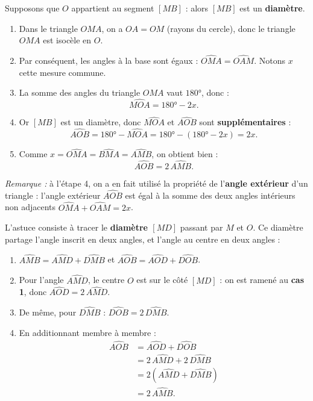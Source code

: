 \documentclass[11pt]{article}
\newcommand{\cle}[1]{{\popxbold\color{popdark}#1}}
\begin{document}
\begin{experience}
Supposons que $O$ appartient au segment $[MB]$ : alors $[MB]$ est un \textbf{diamètre}.
\begin{enumerate}
\item Dans le triangle $OMA$, on a $OA = OM$ (rayons du cercle), donc le triangle $OMA$ est \cle{isocèle} en $O$.
\item Par conséquent, les angles à la base sont égaux : $\widehat{OMA} = \widehat{OAM}$. Notons $x$ cette mesure commune.
\item La somme des angles du triangle $OMA$ vaut $180°$, donc :
\[ \widehat{MOA} = 180° - 2x. \]
\item Or $[MB]$ est un diamètre, donc $\widehat{MOA}$ et $\widehat{AOB}$ sont \textbf{supplémentaires} :
\[ \widehat{AOB} = 180° - \widehat{MOA} = 180° - (180° - 2x) = 2x. \]
\item Comme $x = \widehat{OMA} = \widehat{BMA} = \widehat{AMB}$, on obtient bien :
\[ \widehat{AOB} = 2\,\widehat{AMB}. \]
\end{enumerate}
\emph{Remarque :} à l'étape 4, on a en fait utilisé la propriété de l'\textbf{angle extérieur} d'un triangle : l'angle extérieur $\widehat{AOB}$ est égal à la somme des deux angles intérieurs non adjacents $\widehat{OMA} + \widehat{OAM} = 2x$.
\end{experience}

\begin{experience}
L'astuce consiste à tracer le \textbf{diamètre $[MD]$} passant par $M$ et $O$. Ce diamètre partage l'angle inscrit en deux angles, et l'angle au centre en deux angles :
\begin{enumerate}
\item $\widehat{AMB} = \widehat{AMD} + \widehat{DMB}$ et $\widehat{AOB} = \widehat{AOD} + \widehat{DOB}$.
\item Pour l'angle $\widehat{AMD}$, le centre $O$ est sur le côté $[MD]$ : on est ramené au \textbf{cas 1}, donc $\widehat{AOD} = 2\,\widehat{AMD}$.
\item De même, pour $\widehat{DMB}$ : $\widehat{DOB} = 2\,\widehat{DMB}$.
\item En additionnant membre à membre :
\begin{align*}
\widehat{AOB} &= \widehat{AOD} + \widehat{DOB} \\
&= 2\,\widehat{AMD} + 2\,\widehat{DMB} \\
&= 2\left(\widehat{AMD} + \widehat{DMB}\right) \\
&= 2\,\widehat{AMB}.
\end{align*}
\end{enumerate}
\end{experience}
\end{document}
